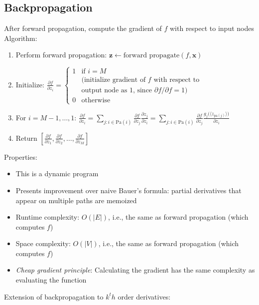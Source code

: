 \subsection*{Backpropagation}
After forward propagation, compute the gradient of $f$ with respect to input nodes\\
Algorithm:
\begin{enumerate}
    \item Perform forward propagation: $\boldsymbol{z} \gets \textrm{forward propagate}(f, \boldsymbol{x})$
    \item Initialize:
    $
    \frac{\partial f}{\partial z_i} =
    \begin{cases}
    1 & \textrm{if } i = M\\
     & (\textrm{initialize gradient of } f \textrm{ with respect to}\\
     & \textrm{output node as 1, since } \partial f / \partial f = 1)\\
    0 & \textrm{otherwise}
    \end{cases}
    $
    \item For $i = M-1, \dots, 1$:
    $
    \frac{\partial f}{\partial z_i} = \sum_{j:i \in \textrm{Pa}(i)} \frac{\partial f}{\partial z_j} \frac{\partial z_j}{\partial z_i} = \sum_{j:i \in \textrm{Pa}(i)} \frac{\partial f}{\partial z_j} \frac{g_j\big(\langle z_{\textrm{pa}(j)} \rangle\big)}{\partial z_i}
    $
    \item Return $\left[ \frac{\partial f}{\partial z_1}, \frac{\partial f}{\partial z_2}, \dots, \frac{\partial f}{\partial z_M} \right]$
\end{enumerate}
Properties:
\begin{itemize}
    \item This is a dynamic program
    \item Presents improvement over naive Bauer's formula: partial derivatives that appear on multiple paths are memoized
    \item Runtime complexity: $O(|E|)$, i.e., the same as forward propagation (which computes $f$)
    \item Space complexity: $O(|V|)$, i.e., the same as forward propagation (which computes $f$)
    \item \emph{Cheap gradient principle}: Calculating the gradient has the same complexity as evaluating the function
\end{itemize}
Extension of backpropagation to $k^th$ order derivatives:
